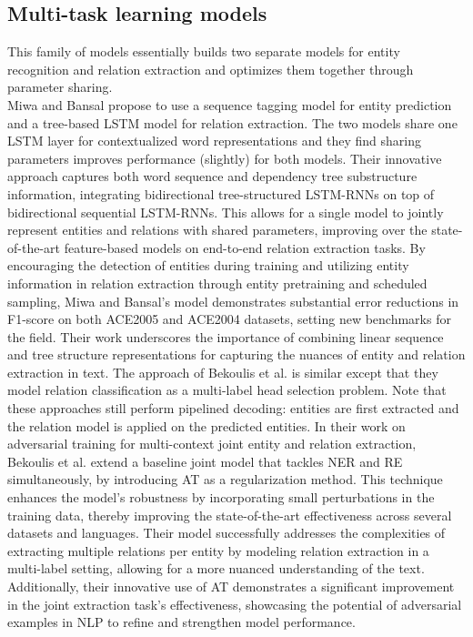 \subsection{Multi-task learning models}
This family of models essentially builds two separate models for entity recognition and relation extraction and optimizes them together through parameter sharing.\\
Miwa and Bansal\cite{miwa-bansal-2016-end} propose to use a sequence tagging model for entity prediction and a tree-based LSTM model for relation extraction. The two models share one LSTM layer for contextualized word representations and they find sharing parameters improves performance (slightly) for both models. Their innovative approach captures both word sequence and dependency tree substructure information, integrating bidirectional tree-structured LSTM-RNNs on top of bidirectional sequential LSTM-RNNs. This allows for a single model to jointly represent entities and relations with shared parameters, improving over the state-of-the-art feature-based models on end-to-end relation extraction tasks. By encouraging the detection of entities during training and utilizing entity information in relation extraction through entity pretraining and scheduled sampling, Miwa and Bansal's model demonstrates substantial error reductions in F1-score on both ACE2005 and ACE2004 datasets, setting new benchmarks for the field. Their work underscores the importance of combining linear sequence and tree structure representations for capturing the nuances of entity and relation extraction in text.
The approach of Bekoulis et al.\cite{bekoulis-etal-2018-adversarial} is similar except that they model relation classification as a multi-label head selection problem. Note that these approaches still perform pipelined decoding: entities are first extracted and the relation model is applied on the predicted entities. In their work on adversarial training for multi-context joint entity and relation extraction, Bekoulis et al. extend a baseline joint model that tackles NER and RE simultaneously, by introducing \ac{AT} as a regularization method. This technique enhances the model's robustness by incorporating small perturbations in the training data, thereby improving the state-of-the-art effectiveness across several datasets and languages. Their model successfully addresses the complexities of extracting multiple relations per entity by modeling relation extraction in a multi-label setting, allowing for a more nuanced understanding of the text. Additionally, their innovative use of AT demonstrates a significant improvement in the joint extraction task's effectiveness, showcasing the potential of adversarial examples in NLP to refine and strengthen model performance.\\

